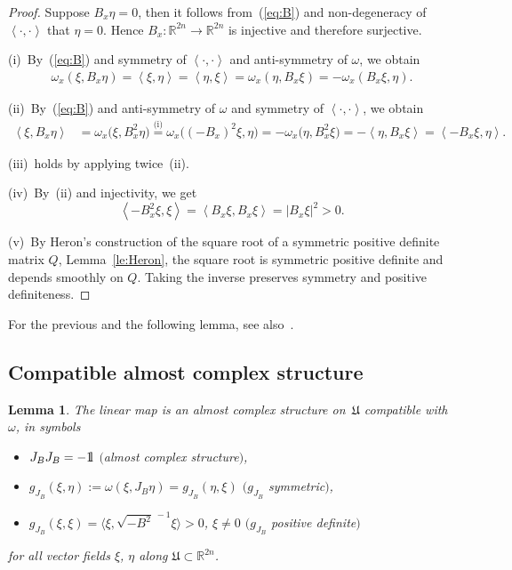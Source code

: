 \documentclass[pdftex]{sigma}
\numberwithin{equation}{section}
\newtheorem{Lemma}[Theorem]{Lemma}
\newcommand{\R}{{\mathbb{R}}}
\newcommand{\INNER}[2]{\left\langle #1, #2\right\rangle}
\def\abs#1{\mathopen|#1\mathclose|}
\newcommand{\1}{{{\mathchoice {\rm 1\mskip-4mu l} {\rm 1\mskip-4mu l}
{\rm 1\mskip-4.5mu l} {\rm 1\mskip-5mu l}}}}
\begin{document}
\begin{proof}
Suppose $B_x\eta=0$, then it follows from~(\ref{eq:B}) and
non-degeneracy of $\INNER{\cdot}{\cdot}$ that $\eta=0$.
Hence $B_x\colon\R^{2n}\to\R^{2n}$ is injective and therefore surjective.

(i)~By~(\ref{eq:B}) and symmetry of $\INNER{\cdot}{\cdot}$
and anti-symmetry of $\omega$, we obtain
\begin{equation*}
\begin{split}
 \omega_x(\xi,B_x\eta)
 =\INNER{\xi}{\eta}
 =\INNER{\eta}{\xi}
 =\omega_x(\eta,B_x\xi)
 =-\omega_x(B_x\xi,\eta) .
\end{split}
\end{equation*}

(ii)~By~(\ref{eq:B}) and anti-symmetry of $\omega$ and symmetry of
$\INNER{\cdot}{\cdot}$, we obtain
\begin{equation*}
\begin{split}
 \INNER{\xi}{B_x\eta}
 &=\omega_x\bigl(\xi,B_x^2\eta\bigr)
 \stackrel{\text{(i)}}{=}\omega_x\bigl((-B_x)^2\xi,\eta\bigr)
 =-\omega_x\bigl(\eta,B_x^2\xi\bigr)
 =-\INNER{\eta}{B_x\xi}
 =\INNER{-B_x\xi}{\eta} .
\end{split}
\end{equation*}

(iii)~holds by applying twice~(ii).

(iv)~By~(ii) and injectivity, we get
\[
 \INNER{-B_x^2\xi}{\xi}
 =\INNER{B_x\xi}{B_x\xi}
 =\abs{B_x\xi}^2>0.
\]

(v)~By Heron's construction of the square root of a symmetric positive
definite matrix $Q$, Lemma~\ref{le:Heron}, the square root is
symmetric positive definite and depends smoothly on $Q$.
Taking the inverse preserves symmetry and positive definiteness.
\end{proof}

For the previous and the following lemma,
see also~\cite[Proposition~2.5.6]{McDuff:2017b}.

\subsection{Compatible almost complex structure}

\begin{Lemma}\label{le:J_B}
The linear map \smash{$J_B:=\sqrt{-B^2}^{\,-1} B\colon\R^{2n}\to\R^{2n}$}
is an almost complex structure on~$\mathfrak{U}$ compatible with $\omega$, in symbols
\begin{itemize}\itemsep=0ex
\item[$(a)$]
 $J_BJ_B=-\1$
 $($almost complex structure$)$,
\item[$(b)$]
 $g_{J_B}(\xi,\eta):=\omega(\xi,J_B \eta)=g_{J_B}(\eta,\xi)$ $(g_{J_B}$ symmetric$)$,
\item[$(c)$]
 $g_{J_B}(\xi,\xi)=\big\langle{\xi},{\sqrt{-B^2}^{\,-1} \xi}\big\rangle>0$, $\xi\not=0$
 $(g_{J_B}$ positive definite$)$
\end{itemize}
for all vector fields $\xi$, $\eta$ along $\mathfrak{U}\subset\R^{2n}$.
\end{Lemma}
\end{document}

